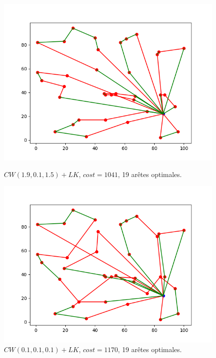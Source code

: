 \documentclass[a4paper,11pt]{article}%
\begin{document}
\begin{figure}
    \begin{minipage}[c]{.46\linewidth}
        \centering
  	\includegraphics[scale=0.4]{edges190115.png}
	\caption{$CW(1.9,0.1,1.5)+LK$, $cost = 1041$, 19 arêtes optimales.}
	\label{edges190115}
    \end{minipage}
    \hfill%
    \begin{minipage}[c]{.46\linewidth}
        \centering
	\includegraphics[scale=0.4]{edges101010.png}
	\caption{$CW(0.1,0.1,0.1)+LK$, $cost = 1170$, 19 arêtes optimales.}
	\label{edges101010}
    \end{minipage}


\end{figure}
\end{document}
